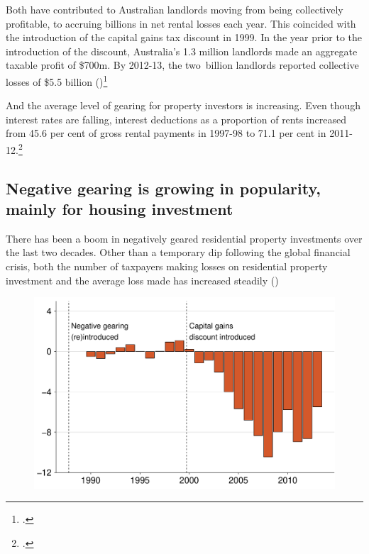 \documentclass{grattan}\usepackage[]{graphicx}\usepackage[]{color}
\begin{document}
Both have contributed to Australian landlords moving from being collectively profitable, to accruing billions in net rental losses each year. This coincided with the introduction of the capital gains tax discount in 1999. In the year prior to the introduction of the discount, Australia's 1.3 million landlords made an aggregate taxable profit of \$700m. By 2012-13, the two~billion landlords reported collective losses of \$5.5 billion ()\footcites{Eslake2013}{Treasury2015a}

And the average level of gearing for property investors is increasing. Even though interest rates are falling, interest deductions as a proportion of rents increased from 45.6 per cent of gross rental payments in 1997-98 to 71.1 per cent in 2011-12.\footcite[p.~65]{Treasury2015a}
\subsection{Negative gearing is growing in popularity, mainly for housing investment}
There has been a boom in negatively geared residential property investments over the last two decades. Other than a temporary dip following the global financial crisis, both the number of taxpayers making losses on residential property investment and the average loss made has increased steadily ()




\begin{figure}[t]
\includegraphics[width=\columnwidth]{figure/Net_rent_over_time-1}

\end{figure}
\end{document}
